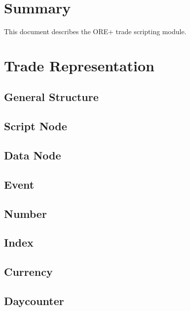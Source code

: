 \documentclass[12pt, a4paper]{article}
\begin{document}
\newpage

\section{Summary}

This document describes the ORE+ trade scripting module.

\section{Trade Representation}

\subsection{General Structure}\label{generalStructure}


\subsection{Script Node}\label{scriptNode}


\subsection{Data Node}\label{dataNode}


\subsection{Event}\label{event}


\subsection{Number}


\subsection{Index}\label{data_index}


\subsection{Currency}


\subsection{Daycounter}

\end{document}
